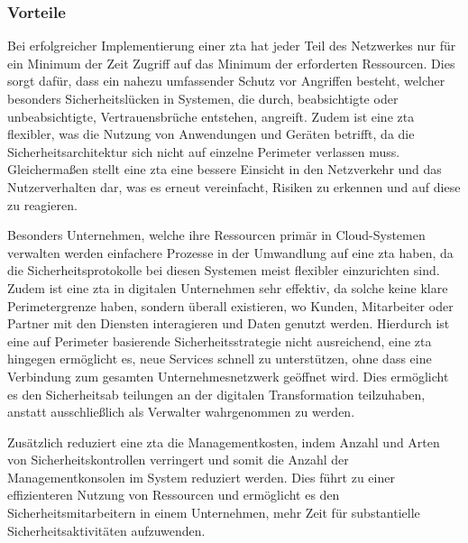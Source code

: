 \subsubsection{Vorteile}\label{subsubsec:vorteile}
Bei erfolgreicher Implementierung einer \ac{zta} hat jeder Teil des Netzwerkes nur für ein Minimum der Zeit Zugriff auf das Minimum der erforderten Ressourcen.
Dies sorgt dafür, dass ein nahezu umfassender Schutz vor Angriffen besteht, welcher besonders Sicherheitslücken in Systemen, die durch, beabsichtigte oder unbeabsichtigte, Vertrauensbrüche entstehen, angreift\autocite[\vglf][]{Edo-2022}.
Zudem ist eine \ac{zta} flexibler, was die Nutzung von Anwendungen und Geräten betrifft, da die Sicherheitsarchitektur sich nicht auf einzelne Perimeter verlassen muss.\autocites[\vglf][]{shore-2021}[\vglf][]{hunter-2020}
Gleichermaßen stellt eine \ac{zta} eine bessere Einsicht in den Netzverkehr und das Nutzerverhalten dar, was es erneut vereinfacht, Risiken zu erkennen und auf diese zu reagieren.\autocite[\vglf][]{shore-2021}

Besonders Unternehmen, welche ihre Ressourcen primär in Cloud-Systemen verwalten werden einfachere Prozesse in der Umwandlung auf eine \ac{zta} haben, da die Sicherheitsprotokolle bei diesen Systemen meist flexibler einzurichten sind.
Zudem ist eine \ac{zta} in digitalen Unternehmen sehr effektiv, da solche keine klare Perimetergrenze haben, sondern überall existieren, wo Kunden, Mitarbeiter oder Partner mit den Diensten interagieren und Daten genutzt werden.
Hierdurch ist eine auf Perimeter basierende Sicherheitsstrategie nicht ausreichend, eine \ac{zta} hingegen ermöglicht es, neue Services schnell zu unterstützen, ohne dass eine Verbindung zum gesamten Unternehmesnetzwerk geöffnet wird.
Dies ermöglicht es den Sicherheitsab    teilungen an der digitalen Transformation teilzuhaben, anstatt ausschließlich als Verwalter wahrgenommen zu werden.\autocite[\vglf][]{cunningham-2019}

Zusätzlich reduziert eine \ac{zta} die Managementkosten, indem Anzahl und Arten von Sicherheitskontrollen verringert und somit die Anzahl der Managementkonsolen im System reduziert werden.
Dies führt zu einer effizienteren Nutzung von Ressourcen und ermöglicht es den Sicherheitsmitarbeitern in einem Unternehmen, mehr Zeit für substantielle Sicherheitsaktivitäten aufzuwenden.\autocite[\vglf][]{cunningham-2019}

